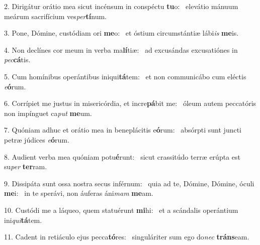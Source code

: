 2. Dirigátur orátio mea sicut incénsum in conspéctu \textbf{tu}o: \ast\  elevátio mánuum meárum sacrifícium ves\textit{per}\textbf{tí}num.\

3. Pone, Dómine, custódiam ori \textbf{me}o: \ast\  et óstium circumstántiæ lábi\textit{is} \textbf{me}is.\

4. Non declínes cor meum in verba ma\textbf{lí}tiæ: \ast\  ad excusándas excusatiónes in \textit{pec}\textbf{cá}tis.\

5. Cum homínibus operántibus iniqui\textbf{tá}tem: \ast\  et non communicábo cum eléctis \textit{e}\textbf{ó}rum.\

6. Corrípiet me justus in misericórdia, et incre\textbf{pá}bit me: \ast\  óleum autem peccatóris non impínguet ca\textit{put} \textbf{me}um.\

7. Quóniam adhuc et orátio mea in beneplácitis e\textbf{ó}rum: \ast\  absórpti sunt juncti petræ júdices \textit{e}\textbf{ó}rum.\

8. Audient verba mea quóniam potu\textbf{é}runt: \ast\  sicut crassitúdo terræ erúpta est su\textit{per} \textbf{ter}ram.\

9. Dissipáta sunt ossa nostra secus inférnum: \dag\  quia ad te, Dómine, Dómine, óculi \textbf{me}i: \ast\  in te sperávi, non áuferas áni\textit{mam} \textbf{me}am.\

10. Custódi me a láqueo, quem statuérunt \textbf{mi}hi: \ast\  et a scándalis operántium ini\textit{qui}\textbf{tá}tem.\

11. Cadent in retiáculo ejus pecca\textbf{tó}res: \ast\  singuláriter sum ego do\textit{nec} \textbf{tráns}eam.\

